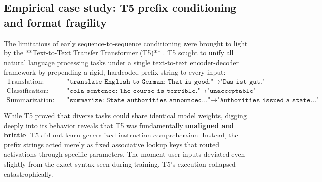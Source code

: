 \documentclass[../../../main.tex]{subfiles}
\begin{document}
\subsection{Empirical case study: T5 prefix conditioning and format fragility}
\label{subsec:t5_empirical_brittleness}

The limitations of early sequence-to-sequence conditioning were brought to light by the **Text-to-Text Transfer Transformer (T5)** \citep{raffel2020t5}. T5 sought to unify all natural language processing tasks under a single text-to-text encoder-decoder framework by prepending a rigid, hardcoded prefix string to every input:
\begin{align*}
\text{Translation:} & \quad \texttt{"translate English to German: That is good."} \longrightarrow \texttt{"Das ist gut."} \\
\text{Classification:} & \quad \texttt{"cola sentence: The course is terrible."} \longrightarrow \texttt{"unacceptable"} \\
\text{Summarization:} & \quad \texttt{"summarize: State authorities announced..."} \longrightarrow \texttt{"Authorities issued a state..."}
\end{align*}

While T5 proved that diverse tasks could share identical model weights, digging deeply into its behavior reveals that T5 was fundamentally \textbf{unaligned and brittle}. T5 did not learn generalized instruction comprehension. Instead, the prefix strings acted merely as fixed associative lookup keys that routed activations through specific parameters. The moment user inputs deviated even slightly from the exact syntax seen during training, T5's execution collapsed catastrophically.
\end{document}
